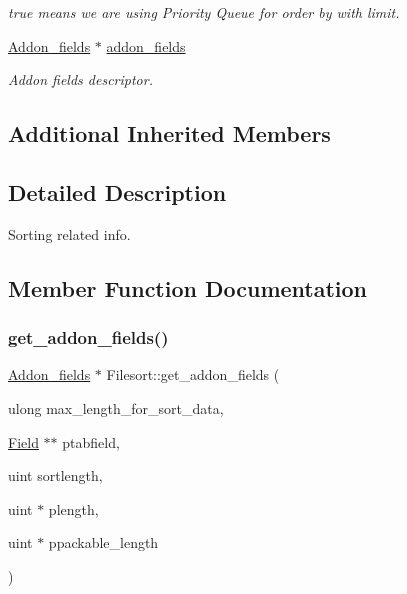 \begin{DoxyCompactItemize}
\begin{DoxyCompactList}\small\item\em true means we are using Priority Queue for order by with limit. \end{DoxyCompactList}\item 
\mbox{\label{classFilesort_ac6d719110824dc3ed83e734cca57b988}} 
\mbox{\hyperlink{classAddon__fields}{Addon\+\_\+fields}} $\ast$ \mbox{\hyperlink{classFilesort_ac6d719110824dc3ed83e734cca57b988}{addon\+\_\+fields}}
\begin{DoxyCompactList}\small\item\em Addon fields descriptor. \end{DoxyCompactList}\end{DoxyCompactItemize}
\subsection*{Additional Inherited Members}


\subsection{Detailed Description}
Sorting related info. 

\subsection{Member Function Documentation}
\mbox{\label{classFilesort_a7b6a9829d340386a342405bcbd1f1fa1}} 
\subsubsection{\texorpdfstring{get\+\_\+addon\+\_\+fields()}{get\_addon\_fields()}}
{\footnotesize\ttfamily \mbox{\hyperlink{classAddon__fields}{Addon\+\_\+fields}} $\ast$ Filesort\+::get\+\_\+addon\+\_\+fields (\begin{DoxyParamCaption}\item[{ulong}]{max\+\_\+length\+\_\+for\+\_\+sort\+\_\+data,  }\item[{\mbox{\hyperlink{classField}{Field}} $\ast$$\ast$}]{ptabfield,  }\item[{uint}]{sortlength,  }\item[{uint $\ast$}]{plength,  }\item[{uint $\ast$}]{ppackable\+\_\+length }\end{DoxyParamCaption})}

